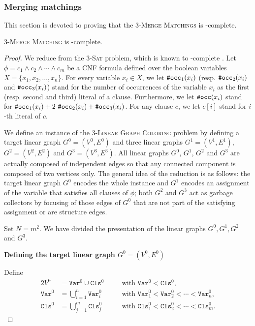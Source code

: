\subsubsection{Merging matchings}
\label{section:Merging matchings}

This section is devoted to proving that the
\textsc{$3$-Merge Matchings} is \NP-complete.

\begin{proposition}
  \label{proposition:3-Linear Graph Coloring is NP-complete}
  \textsc{$3$-Merge Matching} is \NP-complete.
\end{proposition}

\begin{proof}
  We reduce from the \textsc{$3$-Sat} problem, which is known to
  \NP-complete \cite{DBLP:conf/coco/Karp72}.
  Let $\phi = c_1 \wedge c_2 \wedge \cdots \wedge c_m$ be a CNF formula
  defined over the boolean variables $X =\{x_1, x_2, \dots, x_n\}$.
  For every variable $x_{i} \in X$,
  we let $\operatorname{\texttt{\#occ}}_1(x_{i})$ (resp. $\operatorname{\texttt{\#occ}}_2(x_{i})$ and $\operatorname{\texttt{\#occ}}_3(x_{i})$)
  stand for the number of occurrences of the variable $x_{i}$ as the first (resp. second and third)
  literal of a clause.
  Furthermore, we let $\operatorname{\texttt{\#occ}}(x_{i})$ stand for
  $\operatorname{\texttt{\#occ}}_1(x_{i}) + 2\,\operatorname{\texttt{\#occ}}_2(x_{i}) + \operatorname{\texttt{\#occ}}_3(x_{i})$.
  For any clause $c$, we let $c[i]$ stand for
  $i$-th literal of $c$.

  We define an instance of the \textsc{$3$-Linear Graph Coloring} problem by defining a
  target linear graph $G^{0} = (V^{0}, E^{0})$
  and three linear graphs
  $G^{1} = (V^{1}, E^{1})$, $G^{2} = (V^{2}, E^{2})$ and $G^{3} = (V^{3}, E^{3})$.
  All linear graphs $G^{0}$, $G^{1}$, $G^{2}$ and $G^{3}$ are actually composed
  of independent edges so that any connected component is composed of two vertices only.
  The general idea of the reduction is as follows:
  the target linear graph $G^{0}$ encodes the whole instance
  and $G^{1}$ encodes an assignment of the variable that satisfies all clauses of $\phi$;
  both $G^{2}$ and $G^{3}$ act as garbage collectors by focusing of those edges of $G^{0}$
  that are not part of the satisfying assignment or are structure edges.

  Set $N=m^2$.
  We have divided the presentation of the linear graphs $G^{0}, G^{1}, G^{2}$ and $G^{3}$.

  \medskip
  \textbf{Defining the target linear graph $G^{0} = (V^{0}, E^{0})$}
  \medskip

    Define
    \begin{alignat*} {2}
      V^{0} &= \texttt{Var}^{0} \cup \texttt{Cls}^{0}
      &\quad&\text{with $\texttt{Var}^{0} < \texttt{Cls}^{0}$,}
      \\
      \texttt{Var}^{0} &= \bigcup_{i=1}^{n} \texttt{Var}^{0}_{i}
      &&\text{with $\texttt{Var}^{0}_1 < \texttt{Var}^{0}_2 < \cdots < \texttt{Var}^{0}_n$,}
      \\
      \texttt{Cls}^{0} &= \bigcup_{j=1}^{m} \texttt{Cls}^{0}_{j}
      &&\text{with $\texttt{Cls}^{0}_1 < \texttt{Cls}^{0}_2 < \cdots < \texttt{Cls}^{0}_m$.}
    \end{alignat*}


\end{proof}
